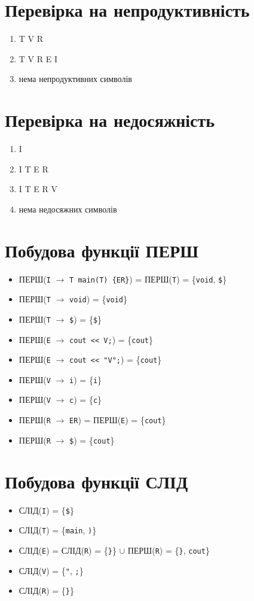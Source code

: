 \section{Перевірка на непродуктивність}
\begin{enumerate}
    \item  T V R
    \item  T V R E I
    \item  нема непродуктивних символів
\end{enumerate}

\section{Перевірка на недосяжність}
\begin{enumerate}
    \item  I
    \item  I T E R
    \item  I T E R V
    \item  нема недосяжних символів
\end{enumerate}


\newpage
\section{Побудова функції ПЕРШ}
\begin{itemize}
    \item  ПЕРШ(\verb|I| $\to$ \verb|T main(T) {ER}|)    = ПЕРШ(\verb|T|) = \{\verb|void|, \verb|$|\}
    \item  ПЕРШ(\verb|T| $\to$ \verb|void|)              = \{\verb|void|\}
    \item  ПЕРШ(\verb|T| $\to$ \verb|$|)                 = \{\verb|$|\}
    \item  ПЕРШ(\verb|E| $\to$ \verb|cout << V;|)        = \{\verb|cout|\}
    \item  ПЕРШ(\verb|E| $\to$ \verb|cout << "V";|)      = \{\verb|cout|\}
    \item  ПЕРШ(\verb|V| $\to$ \verb|i|)                 = \{\verb|i|\}
    \item  ПЕРШ(\verb|V| $\to$ \verb|c|)                 = \{\verb|c|\}
    \item  ПЕРШ(\verb|R| $\to$ \verb|ER|)                = ПЕРШ(\verb|E|) = \{\verb|cout|\}
    \item  ПЕРШ(\verb|R| $\to$ \verb|$|)                 = \{\verb|cout|\}
\end{itemize}

\section{Побудова функції СЛІД}
\begin{itemize}
    \item  СЛІД(\verb|I|) = \{\verb|$|\}
    \item  СЛІД(\verb|T|) = \{\verb|main|, \verb|)|\}
    \item  СЛІД(\verb|E|) = СЛІД(\verb|R|) = \{\verb|}|\} $\cup$ ПЕРШ(\verb|R|) = \{\verb|}|, \verb|cout|\}
    \item  СЛІД(\verb|V|) = \{\verb|"|, \verb|;|\}
    \item  СЛІД(\verb|R|) = \{\verb|}|\}
\end{itemize}

